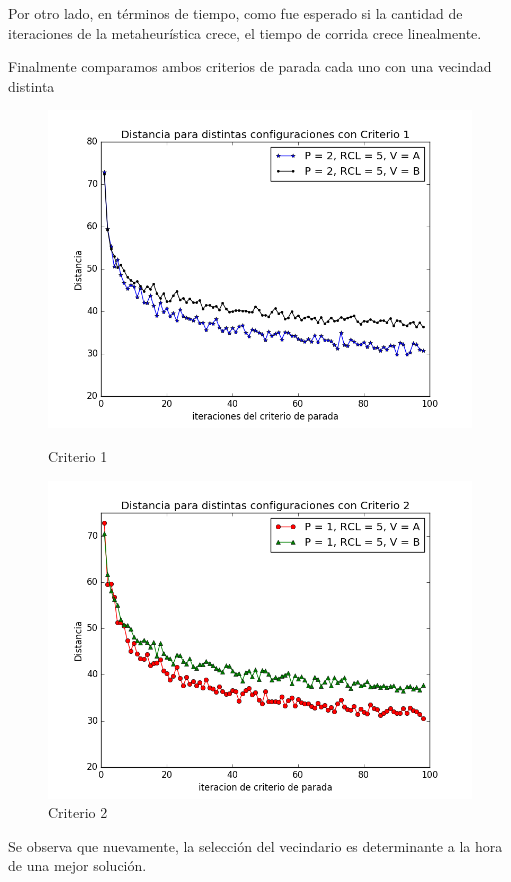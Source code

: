 \par Por otro lado, en términos de tiempo, como fue esperado si la cantidad de iteraciones de la metaheurística crece, el tiempo de corrida crece linealmente.

\par Finalmente comparamos ambos criterios de parada cada uno con una vecindad distinta


\begin{figure}[H]
  \includegraphics[width=\linewidth]{imagenes/Exp2Ej2DistanciaCrit1.png}
  \caption{Criterio 1}
\endminipage\hfill
{}%
  \includegraphics[width=\linewidth]{imagenes/Exp2Ej2DistanciaCrit2.png}
  \caption{Criterio 2}
\endminipage
\end{figure}



Se observa que nuevamente, la selección del vecindario es determinante a la hora de una mejor solución.
